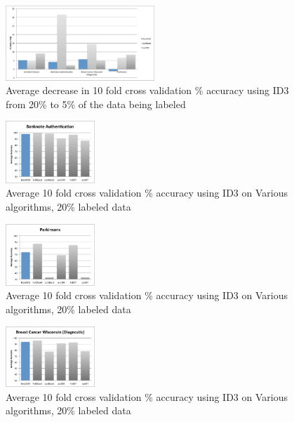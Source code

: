 \documentclass{sig-alternate}
\begin{document}
 \begin{figure}
\centering
\includegraphics[width=0.5\textwidth]{figures/accDrops.pdf}
\caption{Average decrease in 10 fold cross validation \% accuracy using ID3 from 20\% to 5\% of the data being labeled}
\label{accDrop}
\end{figure}
 
\begin{figure}
\centering
\includegraphics[width=0.3\textwidth]{figures/bankAcc.pdf}
\caption{Average 10 fold cross validation \% accuracy using ID3 on Various algorithms, 20\% labeled data}
\label{bankAcc}
\end{figure}
\begin{figure}
\centering
\includegraphics[width=0.3\textwidth]{figures/parkAcc.pdf}
\caption{Average 10 fold cross validation \% accuracy using ID3 on Various algorithms, 20\% labeled data}
\label{parkAcc}
\end{figure}

\begin{figure}
\centering
\includegraphics[width=0.3\textwidth]{figures/breaAcc.pdf}
\caption{Average 10 fold cross validation \% accuracy using ID3 on Various algorithms, 20\% labeled data}
\label{breaAcc}
\end{figure}
\end{document}
